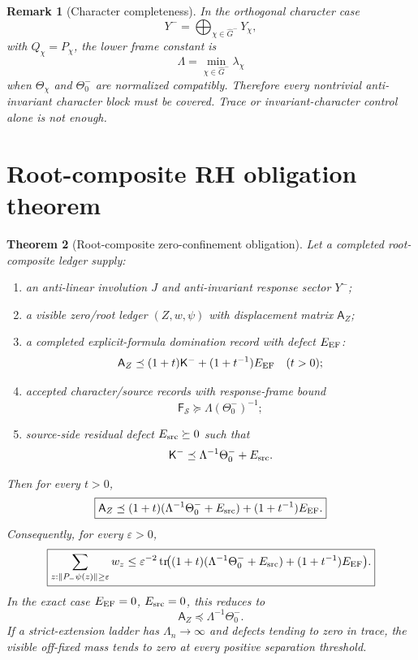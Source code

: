 \documentclass[11pt]{article}
\newtheorem{theorem}{Theorem}[section]
\newtheorem{remark}[theorem]{Remark}
\newcommand{\K}{\mathsf K}
\newcommand{\A}{\mathsf A}
\newcommand{\F}{\mathsf F}
\newcommand{\tr}{\operatorname{tr}}
\begin{document}
\begin{remark}[Character completeness]
In the orthogonal character case
\[
  Y^- = \bigoplus_{\chi\in\widehat G^-}Y_\chi,
\]
with \(Q_\chi=P_\chi\), the lower frame constant is
\[
  \Lambda=\min_{\chi\in\widehat G^-}\lambda_\chi
\]
when \(\Theta_\chi\) and \(\Theta_0^-
\) are normalized compatibly.  Therefore every nontrivial anti-invariant character block must be covered.  Trace or invariant-character control alone is not enough.
\end{remark}

\section{Root-composite RH obligation theorem}

\begin{theorem}[Root-composite zero-confinement obligation]
Let a completed root-composite ledger supply:
\begin{enumerate}[label=(O\arabic*),leftmargin=2.5em]
  \item an anti-linear involution \(J\) and anti-invariant response sector \(Y^-\);
  \item a visible zero/root ledger \((Z,w,\psi)\) with displacement matrix \(\A_Z\);
  \item a completed explicit-formula domination record with defect \(E_{\rm EF}\):
  \[
    \A_Z\preceq (1+t)\K^-+(1+t^{-1})E_{\rm EF}
    \quad(t>0);
  \]
  \item accepted character/source records with response-frame bound
  \[
    \F_{\mathcal S}\succeq \Lambda(\Theta_0^-)^{-1};
  \]
  \item source-side residual defect \(E_{\rm src}\succeq0\) such that
  \[
    \K^-\preceq \Lambda^{-1}\Theta_0^-+E_{\rm src}.
  \]
\end{enumerate}
Then for every \(t>0\),
\[
  \boxed{
  \A_Z\preceq
  (1+t)(\Lambda^{-1}\Theta_0^-+E_{\rm src})
  +(1+t^{-1})E_{\rm EF}.
  }
\]
Consequently, for every \(\varepsilon>0\),
\[
  \boxed{
  \sum_{z:\|P_-\psi(z)\|\ge\varepsilon} w_z
  \le
  \varepsilon^{-2}
  \tr\!\bigl((1+t)(\Lambda^{-1}\Theta_0^-+E_{\rm src})
  +(1+t^{-1})E_{\rm EF}\bigr).
  }
\]
In the exact case \(E_{\rm EF}=0\), \(E_{\rm src}=0\), this reduces to
\[
  \A_Z\preceq \Lambda^{-1}\Theta_0^-.
\]
If a strict-extension ladder has \(\Lambda_n\to\infty\) and defects tending to zero in trace, the visible off-fixed mass tends to zero at every positive separation threshold.
\end{theorem}
\end{document}
